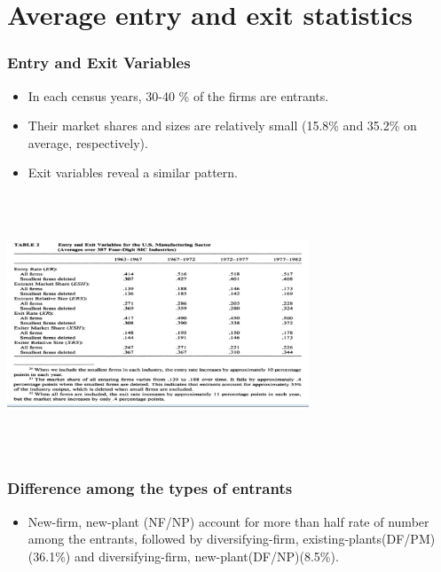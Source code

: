 \documentclass[dvipdfmx,12pt]{beamer}
\begin{document}
\section{Average entry and exit statistics}
\begin{frame}\frametitle{Entry and Exit Variables}

 \begin{itemize}
 
 \item In each census years, 30-40 \% of the firms are entrants.
 
 \item Their market shares and sizes are relatively small (15.8\% and 35.2\% on average, respectively). 
 
 \item Exit variables reveal a similar pattern.
 
 \end{itemize}

\end{frame}

\begin{frame}

\begin{center}

\includegraphics[width=9cm,height=7.75cm]{DRS_T2.pdf}

\end{center}

\end{frame}

\begin{frame}\frametitle{Difference among the types of entrants}

 \begin{itemize}
 
 \item New-firm, new-plant (NF/NP) account for more than half rate of number among the entrants, followed by diversifying-firm, existing-plants(DF/PM)(36.1\%) and diversifying-firm, new-plant(DF/NP)(8.5\%).
 
 \end{itemize}

\end{frame}
\end{document}
